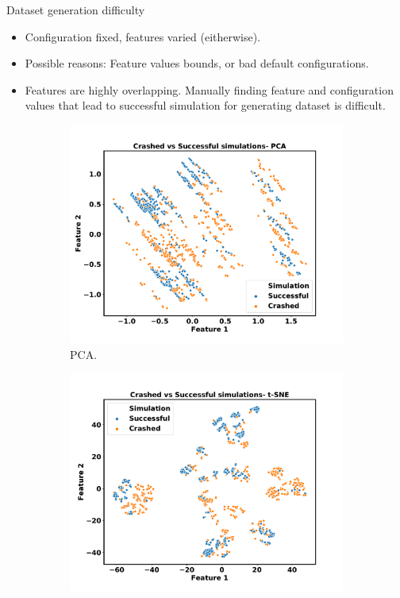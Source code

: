 \documentclass[10pt]{beamer}
\begin{document}
\begin{frame}{Dataset generation difficulty}

\begin{itemize}
\item Configuration fixed, features varied (eitherwise).
\item Possible reasons: Feature values bounds, or bad default configurations.
\item Features are highly overlapping. Manually finding feature and configuration values that lead to successful simulation for generating dataset is difficult.
\end{itemize}
    \begin{figure}[!ht]
        \centering
      \begin{subfigure}{.5\textwidth}
          \centering
          \includegraphics[width=\linewidth]{images/pca.pdf}
          \caption{PCA.}
    \end{subfigure}%
     \begin{subfigure}{.5\textwidth}
          \centering
          \includegraphics[width=\linewidth]{images/tsne.pdf}

\end{subfigure}
\end{figure}
\end{frame}
\end{document}
